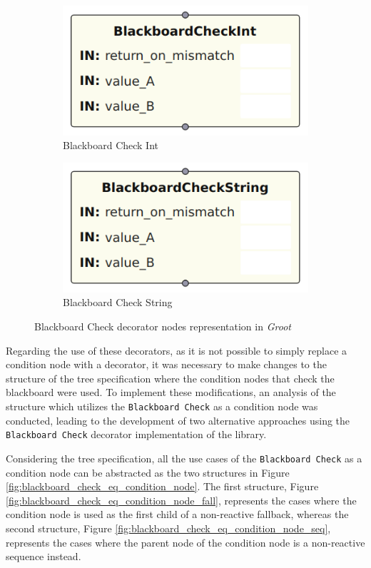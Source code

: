 \begin{figure}[!h]
    \centering
    \begin{subfigure}[b]{.49\linewidth}
        \centering
        \includegraphics[width=0.65\linewidth]{chapters/development/images/BlackboardCheckIntNode.png}
        \caption{Blackboard Check Int}
        \label{fig:blackboard_check_int_impl}
    \end{subfigure}
    \hfill
    \begin{subfigure}[b]{.49\linewidth}
        \centering
        \includegraphics[width=0.65\linewidth]{chapters/development/images/BlackboardCheckStringNode.png}
        \caption{Blackboard Check String}
        \label{fig:blackboard_check_string_impl}
    \end{subfigure}
    \caption{Blackboard Check decorator nodes representation in \textit{Groot}}
    \label{fig:common_decorator_nodes_impl}
\end{figure}

Regarding the use of these decorators, as it is not possible to simply replace a condition node with a decorator, it was necessary to make changes to the structure of the tree specification where the condition nodes that check the blackboard were used. To implement these modifications, an analysis of the structure which utilizes the \texttt{Blackboard Check} as a condition node was conducted, leading to the development of two alternative approaches using the \texttt{Blackboard Check} decorator implementation of the library.

Considering the tree specification, all the use cases of the \texttt{Blackboard Check} as a condition node can be abstracted as the two structures in Figure \ref{fig:blackboard_check_eq_condition_node}. The first structure, Figure \ref{fig:blackboard_check_eq_condition_node_fall}, represents the cases where the condition node is used as the first child of a non-reactive fallback, whereas the second structure, Figure \ref{fig:blackboard_check_eq_condition_node_seq}, represents the cases where the parent node of the condition node is a non-reactive sequence instead.


